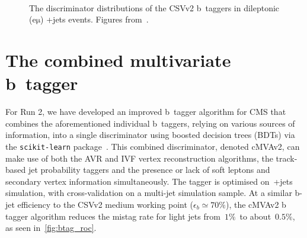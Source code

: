 \begin{figure}
\begin{centering}
 \\
\caption[The CSVv2 b~tagger discriminator distributions]{The discriminator distributions of the CSVv2 b~taggers in dileptonic ($\mathrm{e\mu}$) \ttbar+jets events. Figures from~\cite{CMS-PAS-BTV-15-001}.}
\label{fig:btag_csv}
\end{centering}
\end{figure}

\section{The combined multivariate b~tagger}
For Run 2, we have developed an improved b~tagger algorithm for CMS that combines the aforementioned individual b~taggers, relying on various sources of information, into a single discriminator using boosted decision trees (BDTs) via the \texttt{scikit-learn} package~\cite{scikit-learn}. This combined discriminator, denoted cMVAv2, can make use of both the AVR and IVF vertex reconstruction algorithms, the track-based jet probability taggers and the presence or lack of soft leptons and secondary vertex information simultaneously. The tagger is optimised on~\ttbar+jets simulation, with cross-validation on a multi-jet simulation sample. At a similar b-jet efficiency to the CSVv2 medium working point ($\epsilon_b \simeq 70\%$), the cMVAv2 b tagger algorithm reduces the mistag rate for light jets from~$1\%$~to about~$0.5\%$, as seen in~\cref{fig:btag_roc}.


